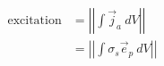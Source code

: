\begin{equation}
    \begin{split}
    \text{excitation} & = \left|\left| \int \vec{j}_a ~ dV \right|\right| \\
                      & = \left|\left| \int \sigma_s \vec{e}_p ~ dV \right|\right|
    \label{eq:excitation}
    \end{split}
\end{equation}
